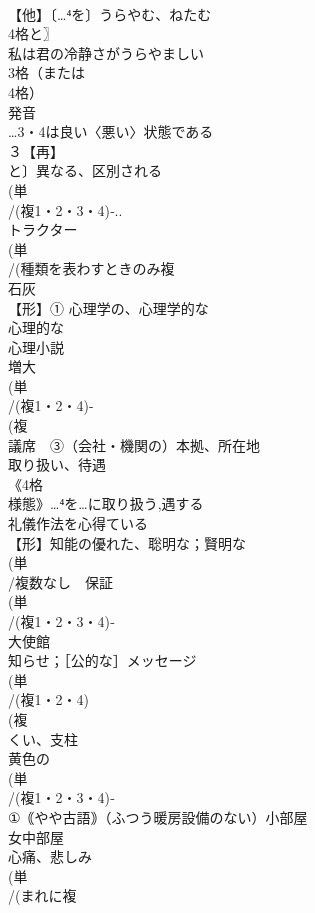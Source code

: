 \documentclass[8pt]{extreport}
\begin{document}
\begin{CJK}{UTF8}{min}
\\	【他】〔…⁴を〕うらやむ、ねたむ 
\\	4格と〗
\\	私は君の冷静さがうらやましい
\\	3格（または
\\	4格）
\\	発音
\\	…3・4は良い〈悪い〉状態である
\\	３【再】
\\	と〕異なる、区別される
\\	(単
\\	/(複1・2・3・4)‐..
\\	トラクター 
\\	(単
\\	/(種類を表わすときのみ複
\\	石灰 
\\	【形】① 心理学の、心理学的な 
\\	心理的な　
\\	心理小説
\\	増大 
\\	(単
\\	/(複1・2・4)-
\\	(複
\\	議席　③（会社・機関の）本拠、所在地
\\	取り扱い、待遇 
\\	《4格
\\	様態》…⁴を…に取り扱う,遇する
\\	礼儀作法を心得ている
\\	【形】知能の優れた、聡明な；賢明な
\\	(単
\\	/複数なし　保証
\\	(単
\\	/(複1・2・3・4)‐
\\	大使館 
\\	知らせ；［公的な］メッセージ
\\	(単
\\	/(複1・2・4)
\\	(複
\\	くい、支柱 
\\	黄色の 
\\	(単
\\	/(複1・2・3・4)‐
\\	①｟やや古語｠（ふつう暖房設備のない）小部屋 
\\	女中部屋 
\\	心痛、悲しみ
\\	(単
\\	/(まれに複

\end{CJK}
\end{document}

